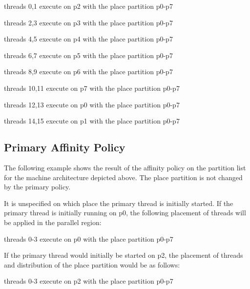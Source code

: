 \begin{compactitem}
\item threads 0,1 execute on p2 with the place partition p0-p7

\item threads 2,3 execute on p3 with the place partition p0-p7

\item threads 4,5 execute on p4 with the place partition p0-p7

\item threads 6,7 execute on p5 with the place partition p0-p7

\item threads 8,9 execute on p6 with the place partition p0-p7

\item threads 10,11 execute on p7 with the place partition p0-p7

\item threads 12,13 execute on p0 with the place partition p0-p7

\item threads 14,15 execute on p1 with the place partition p0-p7
\end{compactitem}

\subsection{Primary Affinity Policy}
\label{subsec:affinity_primary}

The following example shows the result of the  affinity policy on 
the partition list for the machine architecture depicted above. The place partition 
is not changed by the primary policy.


\clearpage

It is unspecified on which place the primary thread is initially started. If the 
primary thread is initially running on p0, the following placement of threads will 
be applied in the parallel region:

\begin{compactitem}
\item threads 0-3 execute on p0 with the place partition p0-p7
\end{compactitem}

If the primary thread would initially be started on p2, the placement of threads 
and distribution of the place partition would be as follows:

\begin{compactitem}
\item threads 0-3 execute on p2 with the place partition p0-p7
\end{compactitem}


